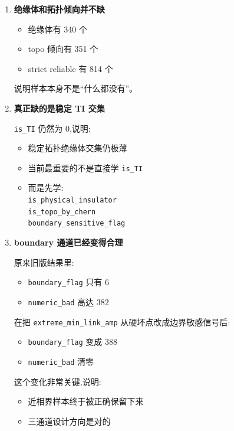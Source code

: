 \documentclass[lang=cn,scheme=chinese,color=blue,device=normal,toc=onecol,math=cm]{elegantbook}
\begin{document}
\begin{enumerate}
\item \textbf{绝缘体和拓扑倾向并不缺}\par
 
\begin{itemize}
\item 绝缘体有 340 个
\item topo 倾向有 351 个
\item strict reliable 有 814 个
\end{itemize}
 
说明样本本身不是“什么都没有”。\par
\item \textbf{真正缺的是稳定 TI 交集}\par
 
\texttt{is\_\allowbreak{}TI} 仍然为 0,说明:\par
 
\begin{itemize}
\item 稳定拓扑绝缘体交集仍极薄
\item 当前最重要的不是直接学 \texttt{is\_\allowbreak{}TI}
\item 而是先学:\\ \texttt{is\_\allowbreak{}physical\_\allowbreak{}insulator}\\ \texttt{is\_\allowbreak{}topo\_\allowbreak{}by\_\allowbreak{}chern}\\ \texttt{boundary\_\allowbreak{}sensitive\_\allowbreak{}flag}
\end{itemize}
\item \textbf{boundary 通道已经变得合理}\par
 
原来旧版结果里:\par
 
\begin{itemize}
\item \texttt{boundary\_\allowbreak{}flag} 只有 6
\item \texttt{numeric\_\allowbreak{}bad} 高达 382
\end{itemize}
 
在把 \texttt{extreme\_\allowbreak{}min\_\allowbreak{}link\_\allowbreak{}amp} 从硬坏点改成边界敏感信号后:\par
 
\begin{itemize}
\item \texttt{boundary\_\allowbreak{}flag} 变成 388
\item \texttt{numeric\_\allowbreak{}bad} 清零
\end{itemize}
 
这个变化非常关键,说明:\par
 
\begin{itemize}
\item 近相界样本终于被正确保留下来
\item 三通道设计方向是对的
\end{itemize}
\end{enumerate}
\end{document}
